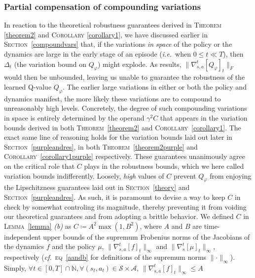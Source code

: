 \subsubsection{Partial compensation of compounding variations}
\label{partialcompensate}

In reaction to the theoretical robustness guarantees derived in
\textsc{Theorem} \ref{theorem2} and \textsc{Corollary} \ref{corollary1},
we have discussed earlier in \textsc{Section}~\ref{compoundvars} that,
if the variations \emph{in space} of the policy or the dynamics are large
in the early stage of an episode (\textit{i.e.}~when $0 \leq t \ll T$),
then $\Delta_t$ (the variation bound on $Q_\varphi$) might explode.
As results, $\lVert \nabla_{s,a}^t[Q_\varphi]_t \rVert _F$ would then be unbounded,
leaving us unable to guarantee the robustness of the learned Q-value $Q_\varphi$.
The earlier large variations in either or both the policy and dynamics manifest,
the more likely these variations are to compound to unreasonably high levels.
Concretely, the degree of such compounding variations in space is entirely determined by
the operand $\gamma^2 C$ that appears in the variation bounds derived in both
\textsc{Theorem}~\ref{theorem2} and \textsc{Corollary}~\ref{corollary1}.
The exact same line of reasoning holds for the variation bounds laid out later in
\textsc{Section}~\ref{purpleandres}, in both
\textsc{Theorem}~\ref{theorem2purple} and \textsc{Corollary}~\ref{corollary1purple} respectively.
These guarantees unanimously agree on the critical role that $C$ plays in
the robustness bounds, which we here called variation bounds indifferently.
Loosely, \emph{high} values of $C$ prevent $Q_\varphi$ from enjoying the
Lipschitzness guarantees
laid out in \textsc{Section}~\ref{theory} and \textsc{Section}~\ref{purpleandres}.
As such, it is paramount to devise a way to keep $C$ in check
by somewhat controling its magnitude,
thereby preventing it from voiding our theoretical guarantees
and from adopting a brittle behavior.
We defined $C$ in \textsc{Lemma}~\ref{lemma} \textit{(b)} as
$C \coloneqq A^2 \max(1, B^2)$, where $A$ and $B$ are time-independent upper bounds of
the supremum Frobenius norms of the Jacobians of the dynamics $f$ and the policy $\mu$,
$\lVert\nabla_{s,a}^t[f]_t\rVert _\infty$ and $\lVert\nabla_s^t[\mu]_t\rVert _\infty$,
respectively
(\textit{cf.}~\textsc{eq}~\ref{aandb} for definitions of the supremum norms $\lVert \cdot \rVert _\infty$).
Simply,
$\forall t \in [0, T] \cap \mathbb{N},
\forall (s_t, a_t) \in \mathcal{S} \times \mathcal{A}$,
$\lVert\nabla_{s,a}^t[f]_t\rVert _\infty \leq A$

